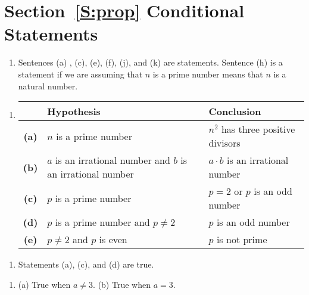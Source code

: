 \section*{Section~\ref{S:prop} Conditional Statements}
\noindent

\begin{enumerate}
\item Sentences (a) , (c), (e), (f), (j), and  (k) are statements.  Sentence (h) is a statement if we are assuming that $n$ is a prime number means that  $n$ is a natural number.
\end{enumerate}



\begin{enumerate} \item
\begin{tabular}[t]{| c | p{2.0in} | p{2.0in} |} \hline
  &  Hypothesis  &  Conclusion \\ \hline
\bf{(a)}  &  $n$ is a prime number  &  $n^2$ has three positive divisors \\ \hline
\bf{(b)}  &  $a$ is an irrational number and $b$ is an irrational number  &  $a \cdot b$ is an irrational number \\ \hline
\bf{(c)}  &  $p$ is a prime number  &  $p = 2$ or $p$ is an odd number  \\ \hline
\bf{(d)}  &  $p$ is a prime number and $p \ne 2$  &  $p$ is an odd number \\ \hline
\bf{(e)}  &  $p \ne 2$ and $p$ is even  &  $p$ is not prime \\  \hline
\end{tabular}
\end{enumerate}

\begin{enumerate}  
\item Statements (a), (c), and (d) are true.
\end{enumerate}

\begin{enumerate}
\item (a) True when $a \ne 3$.  (b) True when $a= 3$.
\end{enumerate}


